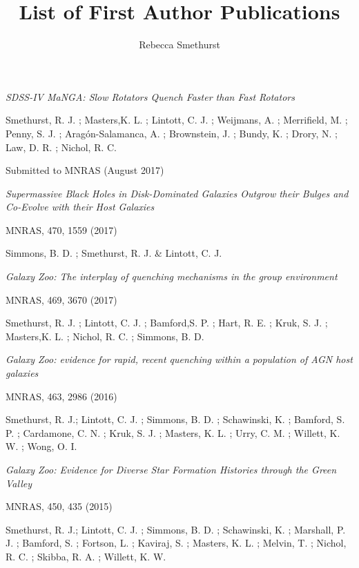 \documentclass{article}
\begin{document}
\title{List of First Author Publications}
\author{Rebecca Smethurst}

\maketitle


\hangindent=15pt \indent \emph{SDSS-IV MaNGA: Slow Rotators Quench Faster than Fast Rotators}

\hangindent=30pt \indent \indent Smethurst, R. J. ; Masters,K. L. ; Lintott, C. J. ; Weijmans, A. ; Merrifield, M. ; Penny, S. J. ;  Arag\'on-Salamanca, A. ; Brownstein, J. ; Bundy, K. ; Drory, N. ; Law, D. R. ; Nichol, R. C. 

\indent \indent Submitted to MNRAS (August 2017)

\medskip

\hangindent=15pt \indent \emph{Supermassive Black Holes in Disk-Dominated Galaxies Outgrow their Bulges and Co-Evolve with their Host Galaxies}

\indent \indent MNRAS, 470, 1559 (2017)

\indent \indent Simmons, B. D. ; Smethurst, R. J. \& Lintott, C. J.


\medskip


\hangindent=15pt \indent \emph{Galaxy Zoo: The interplay of quenching mechanisms in the group environment}

\indent \indent MNRAS, 469, 3670 (2017)

\hangindent=30pt \indent \indent Smethurst, R. J. ; Lintott, C. J. ; Bamford,S. P. ; Hart, R. E. ; Kruk, S. J. ; Masters,K. L. ; Nichol, R. C. ; Simmons, B. D.

\medskip

\hangindent=15pt \indent \emph{Galaxy Zoo: evidence for rapid, recent quenching within a population of AGN host galaxies}

\indent \indent MNRAS, 463, 2986 (2016)

\hangindent=30pt \indent \indent Smethurst, R. J.; Lintott, C. J. ; Simmons, B. D. ; Schawinski, K. ; Bamford, S. P. ; Cardamone, C. N. ; Kruk, S. J. ; Masters, K. L. ; Urry, C. M. ; Willett, K. W. ; Wong, O. I.

\medskip

\hangindent=15pt \indent \emph{Galaxy Zoo: Evidence for Diverse Star Formation Histories through the Green Valley}

\indent \indent MNRAS, 450, 435 (2015)

\hangindent=30pt \indent \indent Smethurst, R. J.; Lintott, C. J. ; Simmons, B. D. ; Schawinski, K. ; Marshall, P. J. ; Bamford, S. ; Fortson, L. ; Kaviraj, S. ; Masters, K. L. ; Melvin, T. ; Nichol, R. C. ; Skibba, R. A. ; Willett, K. W.
\end{document}
